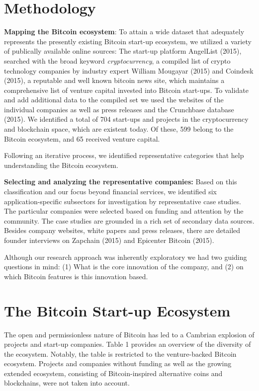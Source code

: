 \section{Methodology}

\textbf{Mapping the Bitcoin ecosystem}: To attain a wide dataset that adequately 
represents the presently existing Bitcoin start-up ecosystem, we utilized a variety 
of publically available online sources: The start-up platform AngelList (2015), 
searched with the broad keyword \emph{cryptocurrency}, a compiled list of crypto technology 
companies by industry expert William Mougayar (2015) and Coindesk (2015), a reputable 
and well known bitcoin news site, which maintains a comprehensive list of venture 
capital invested into Bitcoin start-ups. To validate and add additional data to 
the compiled set we used the websites of the individual companies as well as press 
releases and the Crunchbase database (2015). We identified a total of 704 start-ups 
and projects in the cryptocurrency and blockchain space, which are existent today. 
Of these, 599 belong to the Bitcoin ecosystem, and 65 received venture capital. 

Following an iterative process, we identified representative categories that help 
understanding the Bitcoin ecosystem. 

\textbf{Selecting and analyzing the representative companies: }Based on this classification 
and our focus beyond financial services, we identified six application-specific 
subsectors for investigation by representative case studies. The particular companies 
were selected based on funding and attention by the community. The case studies 
are grounded in a rich set of secondary data sources. Besides company websites, 
white papers and press releases, there are detailed founder interviews on Zapchain 
(2015) and Epicenter Bitcoin (2015). 

Although our research approach was inherently exploratory we had two guiding questions 
in mind: (1) What is the core innovation of the company, and (2) on which Bitcoin 
features is this innovation based.

\section{The Bitcoin Start-up Ecosystem}

The open and permissionless nature of Bitcoin has led to a Cambrian explosion of 
projects and start-up companies. Table 1 provides an overview of the diversity 
of the ecosystem. Notably, the table is restricted to the venture-backed Bitcoin 
ecosystem. Projects and companies without funding as well as the growing extended 
ecosystem, consisting of Bitcoin-inspired alternative coins and blockchains, were 
not taken into account. 

